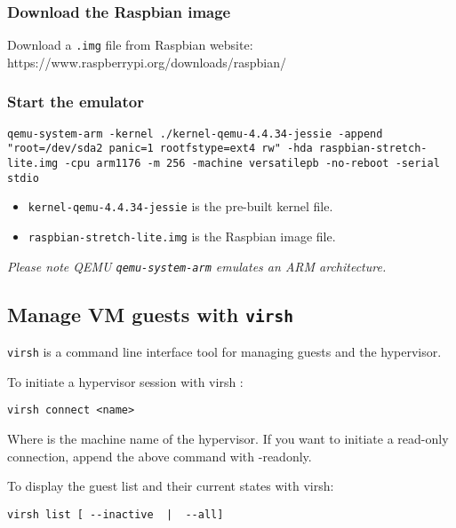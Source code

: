 \subsubsection{Download the Raspbian image}

Download a \texttt{.img} file from Raspbian website:
https://www.raspberrypi.org/downloads/raspbian/

\subsubsection{Start the emulator}

\begin{lstlisting}
qemu-system-arm -kernel ./kernel-qemu-4.4.34-jessie -append "root=/dev/sda2 panic=1 rootfstype=ext4 rw" -hda raspbian-stretch-lite.img -cpu arm1176 -m 256 -machine versatilepb -no-reboot -serial stdio
\end{lstlisting}

\begin{itemize}
\item
  \texttt{kernel-qemu-4.4.34-jessie} is the pre-built kernel file.
\item
  \texttt{raspbian-stretch-lite.img} is the Raspbian image file.
\end{itemize}

\emph{Please note QEMU \texttt{qemu-system-arm} emulates an ARM
architecture.}

\subsection{\texorpdfstring{Manage VM guests with \texttt{virsh}}{Manage VM guests with virsh}}

\texttt{virsh} is a command line interface tool for managing guests and
the hypervisor.

To initiate a hypervisor session with virsh :

\begin{lstlisting}
virsh connect <name>
\end{lstlisting}

Where is the machine name of the hypervisor. If you want to initiate a
read-only connection, append the above command with -readonly.

To display the guest list and their current states with virsh:

\begin{lstlisting}
virsh list [ --inactive  |  --all]
\end{lstlisting}

